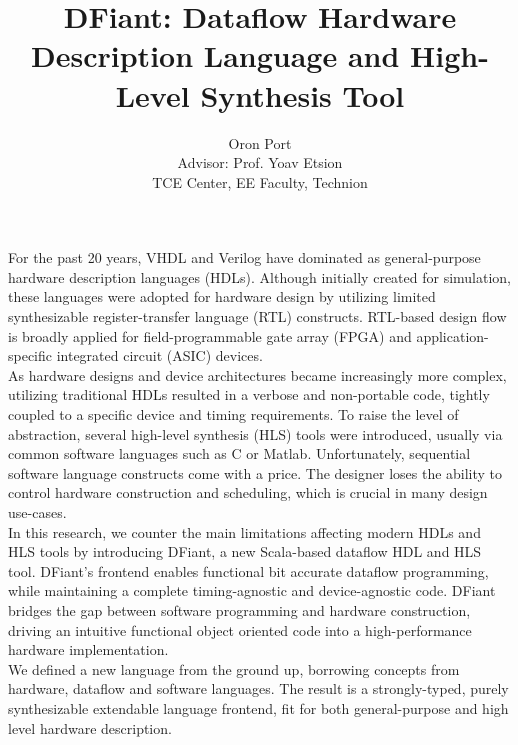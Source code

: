 \documentclass[12pt]{article} %
\title{DFiant: Dataflow Hardware Description Language and High-Level Synthesis Tool}
\author{
  Oron Port \\
  Advisor: Prof. Yoav Etsion \\
  TCE Center, EE Faculty, Technion}
\date{}
\begin{document}
\maketitle
%
{}


For the past 20 years, VHDL and Verilog have dominated as general-purpose hardware description languages (HDLs). Although initially created for simulation, these languages were adopted for hardware design by utilizing limited synthesizable register-transfer language (RTL) constructs. RTL-based design flow is broadly applied for field-programmable gate array (FPGA) and application-specific integrated circuit (ASIC) devices. \\

As hardware designs and device architectures became increasingly more complex, utilizing traditional HDLs resulted in a verbose and non-portable code, tightly coupled to a specific device and timing requirements. To raise the level of abstraction, several high-level synthesis (HLS) tools were introduced, usually via common software languages such as C or Matlab. Unfortunately, sequential software language constructs come with a price. The designer loses the ability to control hardware construction and scheduling, which is crucial in many design use-cases. \\

In this research, we counter the main limitations affecting modern HDLs and HLS tools by introducing DFiant, a new Scala-based dataflow HDL and HLS tool. DFiant's frontend enables functional bit accurate dataflow programming, while maintaining a complete timing-agnostic and device-agnostic code. DFiant bridges the gap between software programming and hardware construction, driving an intuitive functional object oriented code into a high-performance hardware implementation. \\

We defined a new language from the ground up, borrowing concepts from hardware, dataflow and software languages. The result is a strongly-typed, purely synthesizable extendable language frontend, fit for both general-purpose and high level hardware description.
\end{document}
